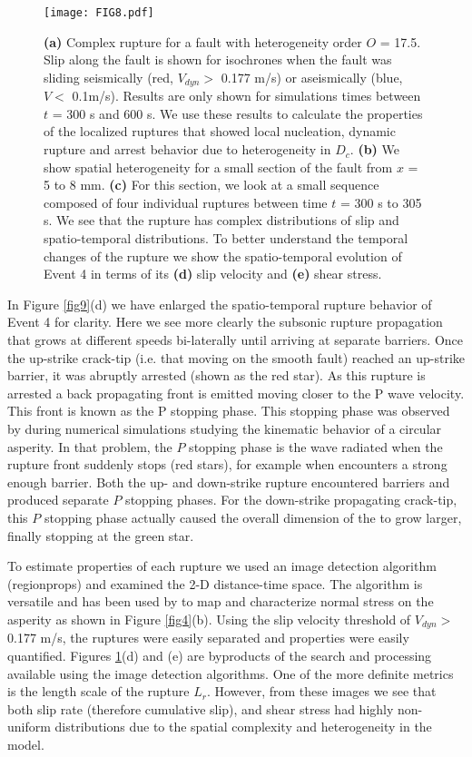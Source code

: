 \documentclass[final,3p, 11pt,authoryear]{elsarticle}
\begin{document}
\begin{figure}
	\centering
	\texttt{[image: FIG8.pdf]} 
	\caption{\textbf{(a)} Complex rupture for a fault with heterogeneity order $O$ = 17.5. Slip along the fault is shown for isochrones when the fault was sliding seismically (red, $V_{dyn}>$ 0.177 m/s) or aseismically (blue, $V <$ 0.1m/s).  Results are only shown for simulations times between $t$ = 300 s and 600 s. We use these results to calculate the properties of the localized ruptures that showed local nucleation, dynamic rupture and arrest behavior due to heterogeneity in $D_{c}$. \textbf{(b)} We show spatial heterogeneity for a small section of the fault from $x$ = 5 to 8 mm. \textbf{(c)} For this section, we look at a small sequence composed of four individual ruptures between time $t$ = 300 s to 305 s.  We see that the rupture has complex distributions of slip and spatio-temporal distributions. To better understand the temporal changes of the rupture we show the spatio-temporal evolution of Event 4 in terms of its \textbf{(d)} slip velocity and \textbf{(e)} shear stress.}
	\label{fig8}
\end{figure}

In Figure \ref{fig9}(d) we have enlarged the spatio-temporal rupture behavior of Event 4 for clarity.  Here we see more clearly the subsonic rupture propagation that grows at different speeds bi-laterally until arriving at separate barriers. Once the up-strike crack-tip (i.e. that moving on the smooth fault) reached an up-strike barrier, it was abruptly arrested (shown as the red star).  As this rupture is arrested a back propagating front is emitted moving closer to the P wave velocity.  This front is known as the P stopping phase.  This stopping phase was observed by \citet{Madariaga1976} during numerical simulations studying the kinematic behavior of a circular asperity.  In that problem, the $P$ stopping phase is the wave radiated when the rupture front suddenly stops (red stars), for example when encounters a strong enough barrier.  Both the up- and down-strike rupture encountered barriers and produced separate $P$ stopping phases.  For the down-strike propagating crack-tip, this $P$ stopping phase actually caused the overall dimension of the to grow larger, finally stopping at the green star. 

To estimate properties of each rupture we used an image detection algorithm (regionprops) and examined the 2-D distance-time space. The algorithm is versatile and has been used by \citet{Selvadurai2015b} to map and characterize normal stress on the asperity as shown in Figure \ref{fig4}(b).  Using the slip velocity threshold of $V_{dyn}>$ 0.177 m/s, the ruptures were easily separated and properties were easily quantified.  Figures \ref{fig8}(d) and (e) are byproducts of the search and processing available using the image detection algorithms.  One of the more definite metrics is the length scale of the rupture $L_{r}$. However, from these images we see that both slip rate (therefore cumulative slip), and shear stress had highly non-uniform distributions due to the spatial complexity and heterogeneity in the model. 
\end{document}
